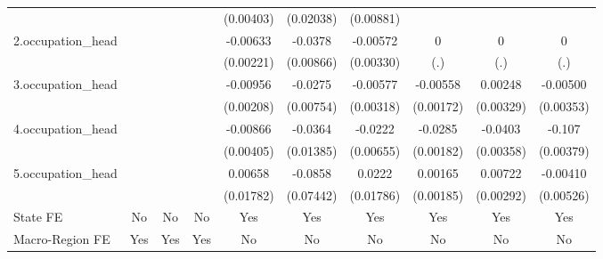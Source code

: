 \begin{table}[htbp]
\begin{tabular}{l*{9}{c}}
            &                     &                     &                     &   (0.00403)         &   (0.02038)         &   (0.00881)         &                     &                     &                     \\
2.occupation\_head&                     &                     &                     &    -0.00633\sym{***}&     -0.0378\sym{***}&    -0.00572\sym{*}  &           0         &           0         &           0         \\
            &                     &                     &                     &   (0.00221)         &   (0.00866)         &   (0.00330)         &         (.)         &         (.)         &         (.)         \\
3.occupation\_head&                     &                     &                     &    -0.00956\sym{***}&     -0.0275\sym{***}&    -0.00577\sym{*}  &    -0.00558\sym{***}&     0.00248         &    -0.00500         \\
            &                     &                     &                     &   (0.00208)         &   (0.00754)         &   (0.00318)         &   (0.00172)         &   (0.00329)         &   (0.00353)         \\
4.occupation\_head&                     &                     &                     &    -0.00866\sym{**} &     -0.0364\sym{***}&     -0.0222\sym{***}&     -0.0285\sym{***}&     -0.0403\sym{***}&      -0.107\sym{***}\\
            &                     &                     &                     &   (0.00405)         &   (0.01385)         &   (0.00655)         &   (0.00182)         &   (0.00358)         &   (0.00379)         \\
5.occupation\_head&                     &                     &                     &     0.00658         &     -0.0858         &      0.0222         &     0.00165         &     0.00722\sym{**} &    -0.00410         \\
            &                     &                     &                     &   (0.01782)         &   (0.07442)         &   (0.01786)         &   (0.00185)         &   (0.00292)         &   (0.00526)         \\
State FE    &          No         &          No         &          No         &         Yes         &         Yes         &         Yes         &         Yes         &         Yes         &         Yes         \\
Macro-Region FE &         Yes         &         Yes         &         Yes         &          No         &          No         &          No         &          No         &          No         &          No         \\

\end{tabular}
\end{table}
